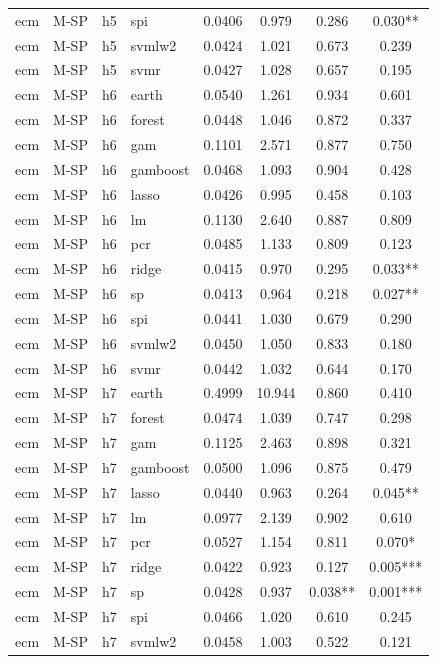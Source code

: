 \begin{ThreePartTable}
\begin{longtable}[t]{llclcccc}
ecm & M-SP & h5 & spi & 0.0406 & 0.979 & 0.286 & 0.030**\\
ecm & M-SP & h5 & svmlw2 & 0.0424 & 1.021 & 0.673 & 0.239\\
ecm & M-SP & h5 & svmr & 0.0427 & 1.028 & 0.657 & 0.195\\
\addlinespace
ecm & M-SP & h6 & earth & 0.0540 & 1.261 & 0.934 & 0.601\\
ecm & M-SP & h6 & forest & 0.0448 & 1.046 & 0.872 & 0.337\\
ecm & M-SP & h6 & gam & 0.1101 & 2.571 & 0.877 & 0.750\\
ecm & M-SP & h6 & gamboost & 0.0468 & 1.093 & 0.904 & 0.428\\
ecm & M-SP & h6 & lasso & 0.0426 & 0.995 & 0.458 & 0.103\\
ecm & M-SP & h6 & lm & 0.1130 & 2.640 & 0.887 & 0.809\\
ecm & M-SP & h6 & pcr & 0.0485 & 1.133 & 0.809 & 0.123\\
ecm & M-SP & h6 & ridge & 0.0415 & 0.970 & 0.295 & 0.033**\\
ecm & M-SP & h6 & sp & 0.0413 & 0.964 & 0.218 & 0.027**\\
ecm & M-SP & h6 & spi & 0.0441 & 1.030 & 0.679 & 0.290\\
ecm & M-SP & h6 & svmlw2 & 0.0450 & 1.050 & 0.833 & 0.180\\
ecm & M-SP & h6 & svmr & 0.0442 & 1.032 & 0.644 & 0.170\\
\addlinespace
ecm & M-SP & h7 & earth & 0.4999 & 10.944 & 0.860 & 0.410\\
ecm & M-SP & h7 & forest & 0.0474 & 1.039 & 0.747 & 0.298\\
ecm & M-SP & h7 & gam & 0.1125 & 2.463 & 0.898 & 0.321\\
ecm & M-SP & h7 & gamboost & 0.0500 & 1.096 & 0.875 & 0.479\\
ecm & M-SP & h7 & lasso & 0.0440 & 0.963 & 0.264 & 0.045**\\
ecm & M-SP & h7 & lm & 0.0977 & 2.139 & 0.902 & 0.610\\
ecm & M-SP & h7 & pcr & 0.0527 & 1.154 & 0.811 & 0.070*\\
ecm & M-SP & h7 & ridge & 0.0422 & 0.923 & 0.127 & 0.005***\\
ecm & M-SP & h7 & sp & 0.0428 & 0.937 & 0.038** & 0.001***\\
ecm & M-SP & h7 & spi & 0.0466 & 1.020 & 0.610 & 0.245\\
ecm & M-SP & h7 & svmlw2 & 0.0458 & 1.003 & 0.522 & 0.121\\

\end{longtable}
\end{ThreePartTable}
